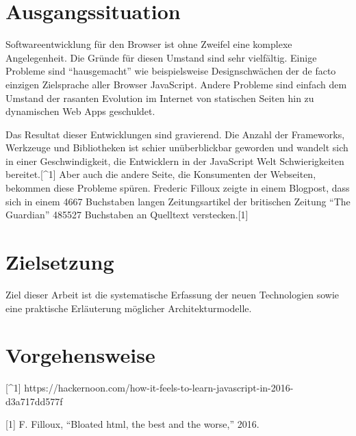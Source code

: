 \section{Ausgangssituation}\label{ausgangssituation}

Softwareentwicklung für den Browser ist ohne Zweifel eine komplexe
Angelegenheit. Die Gründe für diesen Umstand sind sehr vielfältig.
Einige Probleme sind ``hausgemacht'' wie beispielsweise Designschwächen
der de facto einzigen Zielsprache aller Browser JavaScript. Andere
Probleme sind einfach dem Umstand der rasanten Evolution im Internet von
statischen Seiten hin zu dynamischen Web Apps geschuldet.

Das Resultat dieser Entwicklungen sind gravierend. Die Anzahl der
Frameworks, Werkzeuge und Bibliotheken ist schier unüberblickbar
geworden und wandelt sich in einer Geschwindigkeit, die Entwicklern in
der JavaScript Welt Schwierigkeiten bereitet.{[}\^{}1{]} Aber auch die
andere Seite, die Konsumenten der Webseiten, bekommen diese Probleme
spüren. Frederic Filloux zeigte in einem Blogpost, dass sich in einem
4667 Buchstaben langen Zeitungsartikel der britischen Zeitung ``The
Guardian'' 485527 Buchstaben an Quelltext verstecken.{[}1{]}

\section{Zielsetzung}\label{zielsetzung}

Ziel dieser Arbeit ist die systematische Erfassung der neuen
Technologien sowie eine praktische Erläuterung möglicher
Architekturmodelle.

\section{Vorgehensweise}\label{vorgehensweise}

{[}\^{}1{]}
https://hackernoon.com/how-it-feels-to-learn-javascript-in-2016-d3a717dd577f

\hypertarget{refs}{}
\hypertarget{ref-Filloux2016}{}
{[}1{]} F. Filloux, ``Bloated html, the best and the worse,'' 2016.
